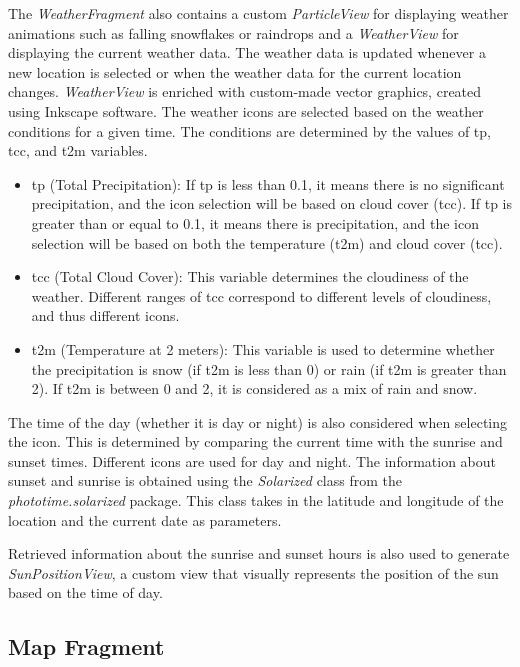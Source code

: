 

The \textit{WeatherFragment} also contains a custom \textit{ParticleView} for displaying weather animations such as falling snowflakes or raindrops and a \textit{WeatherView} for displaying the current weather data. The weather data is updated whenever a new location is selected or when the weather data for the current location changes. \textit{WeatherView} is enriched with custom-made vector graphics, created using Inkscape \cite{inkscape} software. The weather icons are selected based on the weather conditions for a given time. The conditions are determined by the values of tp, tcc, and t2m variables. 

\begin{itemize}
    \item tp (Total Precipitation): If tp is less than 0.1, it means there is no significant precipitation, and the icon selection will be based on cloud cover (tcc). If tp is greater than or equal to 0.1, it means there is precipitation, and the icon selection will be based on both the temperature (t2m) and cloud cover (tcc).
    \item tcc (Total Cloud Cover): This variable determines the cloudiness of the weather. Different ranges of tcc correspond to different levels of cloudiness, and thus different icons.
    \item t2m (Temperature at 2 meters): This variable is used to determine whether the precipitation is snow (if t2m is less than 0) or rain (if t2m is greater than 2). If t2m is between 0 and 2, it is considered as a mix of rain and snow.
\end{itemize}

The time of the day (whether it is day or night) is also considered when selecting the icon. This is determined by comparing the current time with the sunrise and sunset times. Different icons are used for day and night. The information about sunset and sunrise is obtained using the \textit{Solarized} class from the \textit{phototime.solarized} \cite{solarized-android} package. This class takes in the latitude and longitude of the location and the current date as parameters.



Retrieved information about the sunrise and sunset hours is also used to generate \textit{SunPositionView}, a custom view that visually represents the position of the sun based on the time of day.

\subsection{Map Fragment}

